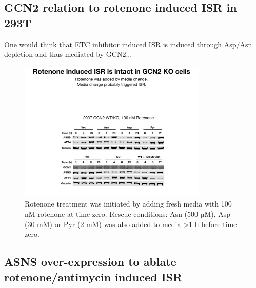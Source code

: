 \subsection{GCN2 relation to rotenone induced ISR in 293T}
One would think that ETC inhibitor induced ISR is induced through Asp/Asn depletion and thus mediated by GCN2...
\begin{figure}
    \centering
    \includegraphics[width=0.80\textwidth]{figures/sapp/ISR/293T_GCN2_ISR.pdf}
    \caption[ATF4 post mito inhib. GCN2 KO, western]{
    Rotenone treatment was initiated by adding fresh media with 100 nM rotenone at time zero.
    Rescue conditions: Asn (500 µM), Asp (30 mM) or Pyr (2 mM) was also added to media >1 h before time zero.
    }
    \label{fig:sapp:ISR:293T_GCN2_ISR}
\end{figure}











\subsection{ASNS over-expression to ablate rotenone/antimycin induced ISR}


